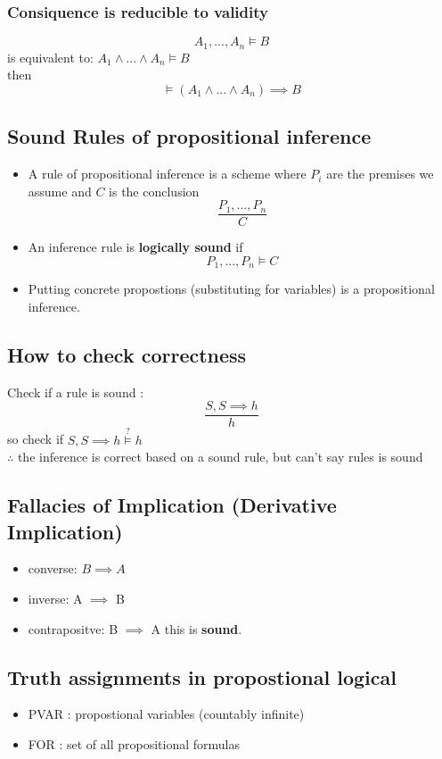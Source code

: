 \documentclass[11pt]{article}
\begin{document}
\subsubsection{Consiquence is reducible to validity}
\label{sec:org2fde082}
$$A_1 , ... , A_n \models B $$ is equivalent to: \(A_1 \land ... \land A_n \models B\)  \\
then $$\models (A_1 \land ... \land A_n) \implies B$$
\subsection{Sound Rules of propositional inference}
\label{sec:orgbafd668}
\begin{itemize}
\item A rule of propositional inference is a scheme where \(P_i\) are the premises we assume and \(C\) is the conclusion $$\frac{P_1 , ..., P_n}{C}$$
\item An inference rule is \textbf{logically sound} if $$P_1 , ..., P_n \models C$$
\item Putting concrete propostions (substituting for variables) is a propositional inference.
\end{itemize}
\subsection{How to check correctness}
\label{sec:orgfcb9638}
Check if a rule is sound : $$\frac{S, S \implies h}{h}$$ so check if \(S, S \implies h \overset{?}{\models} h\) \\
\(\therefore\) the inference is correct based on a sound rule, but can't say rules is sound
\subsection{Fallacies of Implication (Derivative Implication)}
\label{sec:orge2d72cb}
\begin{itemize}
\item converse: \(B \implies A\)
\item inverse: \textlnot{} A \(\implies\) \textlnot{} B
\item contrapositve: \textlnot{} B \(\implies\) \textlnot{} A this is \textbf{sound}.
\end{itemize}
\subsection{Truth assignments in propostional logical}
\label{sec:orgcffe910}
\begin{itemize}
\item PVAR : propostional variables (countably infinite)
\item FOR : set of all propositional formulas
\end{itemize}
\end{document}
